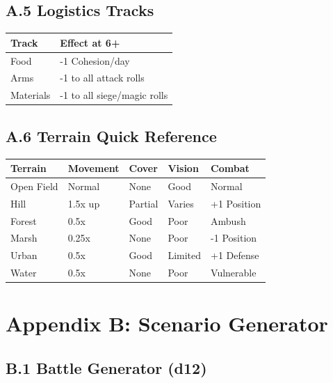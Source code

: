 \documentclass[11pt]{article}
\begin{document}
\subsection{A.5 Logistics Tracks}

\begin{tabular}{|l|l|}
\hline
Track & Effect at 6+ \\
\hline
Food & -1 Cohesion/day \\
\hline
Arms & -1 to all attack rolls \\
\hline
Materials & -1 to all siege/magic rolls \\
\hline
\end{tabular}

\subsection{A.6 Terrain Quick Reference}

\begin{tabular}{|l|l|l|l|l|}
\hline
Terrain & Movement & Cover & Vision & Combat \\
\hline
Open Field & Normal & None & Good & Normal \\
\hline
Hill & 1.5x up & Partial & Varies & +1 Position \\
\hline
Forest & 0.5x & Good & Poor & Ambush \\
\hline
Marsh & 0.25x & None & Poor & -1 Position \\
\hline
Urban & 0.5x & Good & Limited & +1 Defense \\
\hline
Water & 0.5x & None & Poor & Vulnerable \\
\hline
\end{tabular}

\section{Appendix B: Scenario Generator}

\subsection{B.1 Battle Generator (d12)}
\end{document}
